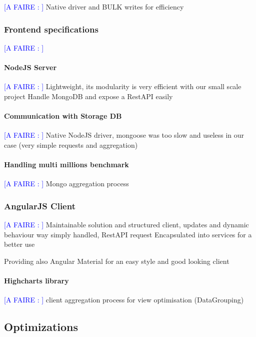\documentclass[a4paper,11pt]{article}
\newcommand*{\todo}[1]{\textcolor{blue}{[A FAIRE : \emph{#1}]}}
\begin{document}
\todo{}
Native driver and BULK writes for efficiency

\subsubsection{Frontend specifications}

\todo{}
\paragraph{NodeJS Server}

\todo{}
Lightweight, its modularity is very efficient with our small scale project
Handle MongoDB and expose a RestAPI easily

\paragraph{Communication with Storage DB}

\todo{}
Native NodeJS driver, mongoose was too slow and useless in our case (very simple requests and aggregation)

\paragraph{Handling multi millions benchmark}

\todo{}
Mongo aggregation process

\subsubsection{AngularJS Client}

\todo{}
Maintainable solution and structured client, updates and dynamic behaviour way simply handled, RestAPI request Encapsulated into services for a better use

Providing also Angular Material for an easy style and good looking client

\paragraph{Highcharts library}

\todo{}
client aggregation process for view optimisation (DataGrouping)

\subsection{Optimizations}\label{optimizations}
\end{document}
